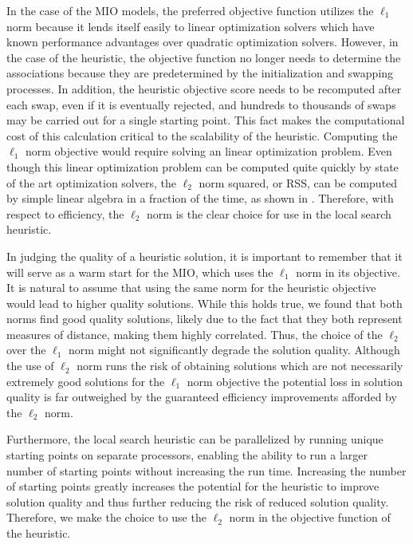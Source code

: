 In the case of the MIO models, the preferred objective function utilizes the $\ell_1$ norm because it lends itself easily to linear optimization solvers which have known performance advantages over quadratic optimization solvers. However, in the case of the heuristic, the objective function no longer needs to determine the associations because they are predetermined by the initialization and swapping processes. In addition, the heuristic objective score needs to be recomputed after each swap, even if it is eventually rejected, and hundreds to thousands of swaps may be carried out for a single starting point. This fact makes the computational cost of this calculation critical to the scalability of the heuristic.  Computing the $\ell_1$ norm objective would require solving an linear optimization problem. Even though this linear optimization problem can be computed quite quickly by state of the art optimization solvers, the $\ell_2$ norm squared, or RSS, can be computed by simple linear algebra in a fraction of the time, as shown in \cite{RSS-Matrix}. Therefore, with respect to efficiency, the $\ell_2$ norm is the clear choice for use in the local search heuristic.

In judging the quality of a heuristic solution, it is important to remember that it will serve as a warm start for the MIO, which uses the $\ell_1$ norm in its objective. It is natural to assume that using the same norm for the heuristic objective would lead to higher quality solutions. While this holds true, we found that both norms find good quality solutions, likely due to the fact that they both represent measures of distance, making them highly correlated. Thus, the choice of the $\ell_2$ over the $\ell_1$ norm might not significantly degrade the solution quality. Although the use of $\ell_2$ norm runs the risk of obtaining solutions which are not necessarily extremely good solutions for the $\ell_1$ norm objective the potential loss in solution quality is far outweighed by the guaranteed efficiency improvements afforded by the $\ell_2$ norm. 

Furthermore, the local search heuristic can be parallelized by running unique starting points on separate processors, enabling the ability to run a larger number of starting points without increasing the run time. Increasing the number of starting points greatly increases the potential for the heuristic to improve solution quality and thus further reducing the risk of reduced solution quality. Therefore, we make the choice to use the $\ell_2$ norm in the objective function of the heuristic.